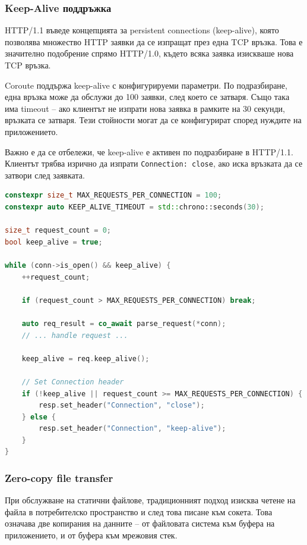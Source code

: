 \subsubsection{Keep-Alive поддръжка}

HTTP/1.1 въведе концепцията за persistent connections (keep-alive), която позволява множество HTTP заявки да се изпращат през една TCP връзка. Това е значително подобрение спрямо HTTP/1.0, където всяка заявка изискваше нова TCP връзка.

Coroute поддържа keep-alive с конфигурируеми параметри. По подразбиране, една връзка може да обслужи до 100 заявки, след което се затваря. Също така има timeout -- ако клиентът не изпрати нова заявка в рамките на 30 секунди, връзката се затваря. Тези стойности могат да се конфигурират според нуждите на приложението.

Важно е да се отбележи, че keep-alive е активен по подразбиране в HTTP/1.1. Клиентът трябва изрично да изпрати \texttt{Connection: close}, ако иска връзката да се затвори след заявката.

\begin{lstlisting}[language=C++, basicstyle=\small\ttfamily, caption={Keep-alive loop}]
constexpr size_t MAX_REQUESTS_PER_CONNECTION = 100;
constexpr auto KEEP_ALIVE_TIMEOUT = std::chrono::seconds(30);

size_t request_count = 0;
bool keep_alive = true;

while (conn->is_open() && keep_alive) {
    ++request_count;
    
    if (request_count > MAX_REQUESTS_PER_CONNECTION) break;
    
    auto req_result = co_await parse_request(*conn);
    // ... handle request ...
    
    keep_alive = req.keep_alive();
    
    // Set Connection header
    if (!keep_alive || request_count >= MAX_REQUESTS_PER_CONNECTION) {
        resp.set_header("Connection", "close");
    } else {
        resp.set_header("Connection", "keep-alive");
    }
}
\end{lstlisting}

\subsubsection{Zero-copy file transfer}

При обслужване на статични файлове, традиционният подход изисква четене на файла в потребителско пространство и след това писане към сокета. Това означава две копирания на данните -- от файловата система към буфера на приложението, и от буфера към мрежовия стек.


